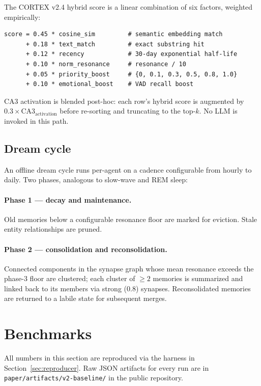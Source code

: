 \documentclass{article}
\begin{document}
The CORTEX v2.4 hybrid score is a linear combination of six factors,
weighted empirically:

\begin{verbatim}
score = 0.45 * cosine_sim         # semantic embedding match
      + 0.18 * text_match         # exact substring hit
      + 0.12 * recency            # 30-day exponential half-life
      + 0.10 * norm_resonance     # resonance / 10
      + 0.05 * priority_boost     # {0, 0.1, 0.3, 0.5, 0.8, 1.0}
      + 0.10 * emotional_boost    # VAD recall boost
\end{verbatim}

CA3 activation is blended post-hoc: each row's hybrid score is
augmented by $0.3 \times \text{CA3}_{\text{activation}}$ before
re-sorting and truncating to the top-$k$. No LLM is invoked in this
path.

\subsection{Dream cycle}

An offline dream cycle runs per-agent on a cadence configurable from
hourly to daily. Two phases, analogous to slow-wave and REM sleep:

\paragraph{Phase 1 --- decay and maintenance.}
Old memories below a configurable resonance floor are marked for
eviction. Stale entity relationships are pruned.

\paragraph{Phase 2 --- consolidation and reconsolidation.}
Connected components in the synapse graph whose mean resonance exceeds
the phase-3 floor are clustered; each cluster of $\geq 2$ memories is
summarized and linked back to its members via strong ($0.8$) synapses.
Reconsolidated memories are returned to a labile state for subsequent
merges.

\section{Benchmarks}
\label{sec:benchmarks}

All numbers in this section are reproduced via the harness in
Section~\ref{sec:reproducer}. Raw JSON artifacts for every run are in
\texttt{paper/artifacts/v2-baseline/} in the public repository.
\end{document}
